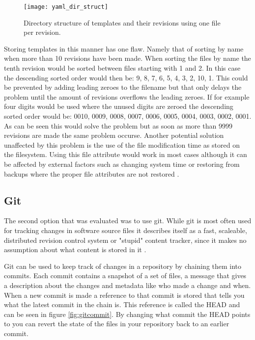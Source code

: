 \begin{figure}[h!]
	\centering
	\texttt{[image: yaml\_dir\_struct]}
	\caption{Directory structure of templates and their revisions using one file per revision.}
	\label{fig:diskstruct}
\end{figure}

Storing templates in this manner has one flaw.
Namely that of sorting by name when more than 10 revisions have been made.
When sorting the files by name the tenth revision would be sorted between files starting with 1 and 2.
In this case the descending sorted order would then be: 9, 8, 7, 6, 5, 4, 3, 2, 10, 1.
This could be prevented by adding leading zeroes to the filename but that only delays the problem until the amount of revisions overflows the leading zeroes.
If for example four digits would be used where the unused digits are zeroed the descending sorted order would be: 0010, 0009, 0008, 0007, 0006, 0005, 0004, 0003, 0002, 0001.
As can be seen this would solve the problem but as soon as more than 9999 revisions are made the same problem occurse.
Another potential solution unaffected by this problem is the use of the file modification time as stored on the filesystem.
Using this file attribute would work in most cases although it can be affected by external factors such as changing system time or restoring from backups where the proper file attributes are not restored \cite{noauthor_mtime_nodate}.

\subsection{Git}
The second option that was evaluated was to use git.
While git is most often used for tracking changes in software source files it describes itself as a fast, scaleable, distributed revision control system or "stupid" content tracker, since it makes no assumption about what content is stored in it \cite{noauthor_git_2016}.

Git can be used to keep track of changes in a repository by chaining them into commits.
Each commit contains a snapshot of a set of files, a message that gives a description about the changes and metadata like who made a change and when.
When a new commit is made a reference to that commit is stored that tells you what the latest commit in the chain is.
This reference is called the HEAD and can be seen in figure \ref{fig:gitcommit}.
By changing what commit the HEAD points to you can revert the state of the files in your repository back to an earlier commit.

